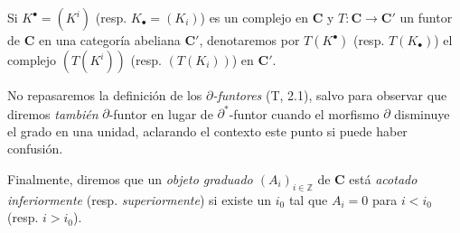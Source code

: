 \begin{env}[11.2.1]
Si $K^\bullet=(K^i)$ (resp. $K_\bullet=(K_i)$) es un complejo en $\boldsymbol{C}$ y $T:\boldsymbol{C}\to\boldsymbol{C}'$ un funtor de $\boldsymbol{C}$ en una categoría abeliana $\boldsymbol{C}'$, denotaremos por $T(K^\bullet)$ (resp. $T(K_\bullet)$) el complejo $(T(K^i))$ (resp. $(T(K_i))$) en $\boldsymbol{C}'$.

No repasaremos la definición de los \emph{$\partial$-funtores} (T, 2.1), salvo para observar que diremos \emph{también} $\partial$-funtor en lugar de $\partial^*$-funtor cuando el morfismo $\partial$ disminuye el grado en una unidad, aclarando el contexto este punto si puede haber confusión.

Finalmente, diremos que un \emph{objeto graduado $(A_i)_{i\in\mathbb Z}$} de $\boldsymbol{C}$ está \emph{acotado inferiormente} (resp. \emph{superiormente}) si existe un $i_0$ tal que $A_i=0$ para $i<i_0$ (resp. $i>i_0$).
\end{env}

